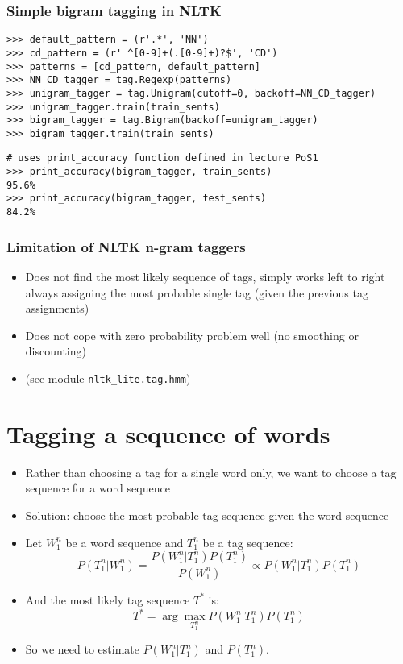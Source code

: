 \begin{frame}[fragile]
  \frametitle{Simple bigram tagging in NLTK}
{\small
\begin{verbatim}
>>> default_pattern = (r'.*', 'NN')
>>> cd_pattern = (r' ^[0-9]+(.[0-9]+)?$', 'CD')
>>> patterns = [cd_pattern, default_pattern]
>>> NN_CD_tagger = tag.Regexp(patterns)
>>> unigram_tagger = tag.Unigram(cutoff=0, backoff=NN_CD_tagger)
>>> unigram_tagger.train(train_sents)
>>> bigram_tagger = tag.Bigram(backoff=unigram_tagger)
>>> bigram_tagger.train(train_sents)
\end{verbatim}%

\begin{verbatim}
# uses print_accuracy function defined in lecture PoS1
>>> print_accuracy(bigram_tagger, train_sents)
95.6%
>>> print_accuracy(bigram_tagger, test_sents)
84.2%
\end{verbatim}
}
\end{frame}

\begin{frame}[fragile]
  \frametitle{Limitation of NLTK n-gram taggers}

  \begin{itemize}
  \item<1-> Does not find the most likely sequence of tags, simply works
    left to right always assigning the most probable single tag (given
    the previous tag assignments)
  \item<1-> Does not cope with zero probability problem well (no smoothing
    or discounting)
  \item<2-> (see module \verb+nltk_lite.tag.hmm+)
  \end{itemize}
\end{frame}

\section{Tagging a sequence of words}

\begin{frame}
  \begin{itemize}
  \item<1-> Rather than choosing a tag for a single word only, we want to
    choose a tag sequence for a word sequence
  \item<1-> Solution: choose the most probable tag sequence given the word
    sequence
  \item<2-> Let $W_1^n$ be a word sequence and $T_1^n$ be a tag sequence:
    \begin{displaymath}
      P(T_1^n|W_1^n) = \frac{P(W_1^n | T_1^n)P(T_1^n)}{P(W_1^n)} \propto P(W_1^n | T_1^n)P(T_1^n)
    \end{displaymath}
  \item<3-> And the most likely tag sequence $T^\ast$ is:
    \[ T^\ast = \arg\max_{T_1^n} P(W_1^n | T_1^n)P(T_1^n) \]
  \item<3-> So we need to estimate $P(W_1^n | T_1^n)$ and $P(T_1^n)$. 
  \end{itemize}
\end{frame}

